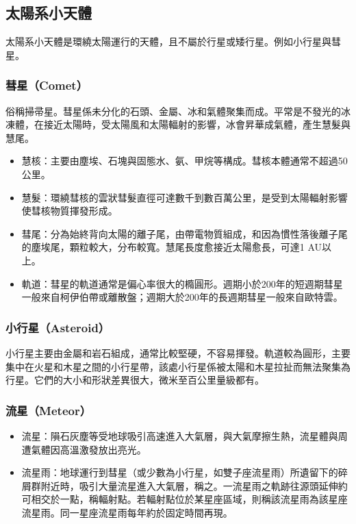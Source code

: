 \documentclass[a4paper,12pt]{report}
\begin{document}
\subsection{太陽系小天體}
太陽系小天體是環繞太陽運行的天體，且不屬於行星或矮行星。例如小行星與彗星。
\subsubsection{彗星（Comet）}
俗稱掃帚星。彗星係未分化的石頭、金屬、冰和氣體聚集而成。平常是不發光的冰凍體，在接近太陽時，受太陽風和太陽輻射的影響，冰會昇華成氣體，產生慧髮與慧尾。
\begin{itemize}
\item 慧核：主要由塵埃、石塊與固態水、氨、甲烷等構成。彗核本體通常不超過50公里。
\item 慧髮：環繞彗核的雲狀彗髮直徑可達數千到數百萬公里，是受到太陽輻射影響使彗核物質揮發形成。
\item 彗尾：分為始終背向太陽的離子尾，由帶電物質組成，和因為慣性落後離子尾的塵埃尾，顆粒較大，分布較寬。慧尾長度愈接近太陽愈長，可達1 AU以上。
\item 軌道：彗星的軌道通常是偏心率很大的橢圓形。週期小於200年的短週期彗星一般來自柯伊伯帶或離散盤；週期大於200年的長週期彗星一般來自歐特雲。
\end{itemize}
\subsubsection{小行星（Asteroid）}
小行星主要由金屬和岩石組成，通常比較堅硬，不容易揮發。軌道較為圓形，主要集中在火星和木星之間的小行星帶，該處小行星係被太陽和木星拉扯而無法聚集為行星。它們的大小和形狀差異很大，微米至百公里量級都有。
\subsubsection{流星（Meteor）}
\begin{itemize}
\item 流星：隕石灰塵等受地球吸引高速進入大氣層，與大氣摩擦生熱，流星體與周遭氣體因高溫激發放出亮光。
\item 流星雨：地球運行到彗星（或少數為小行星，如雙子座流星雨）所遺留下的碎屑群附近時，吸引大量流星進入大氣層，稱之。一流星雨之軌跡往源頭延伸約可相交於一點，稱輻射點。若輻射點位於某星座區域，則稱該流星雨為該星座流星雨。同一星座流星雨每年約於固定時間再現。
\end{itemize}
\end{document}
